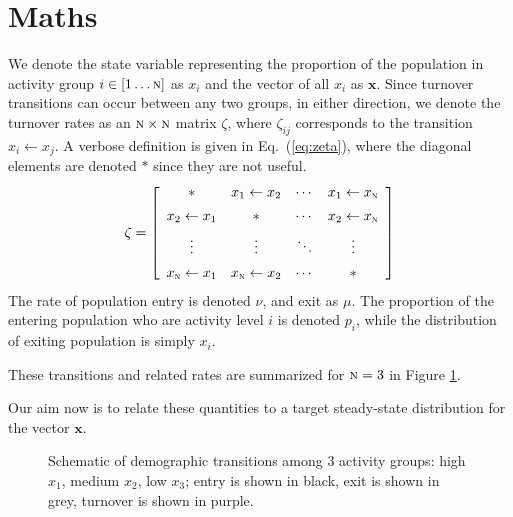 \documentclass{article}
\newcommand{\N}{\textsc{n}}
\begin{document}
\section{Maths}
We denote the state variable representing
the proportion of the population in activity group $i \in [1 \dots \N]$ as $x_i$
and the vector of all $x_i$ as $\bm{x}$.
Since turnover transitions can occur between any two groups, in either direction,
we denote the turnover rates as an $\N \times \N$ matrix $\zeta$,
where $\zeta_{ij}$ corresponds to the transition $x_i \leftarrow x_j$.
A verbose definition is given in Eq.~(\ref{eq:zeta}),
where the diagonal elements are denoted $*$ since they are not useful.
\begin{equation}\label{eq:zeta}
\zeta = \left[\begin{array}{cccc}
	         *          & x_1  \leftarrow x_2 & \cdots & x_1 \leftarrow x_\N \\[0.5em]
	x_2  \leftarrow x_1 &          *          & \cdots & x_2 \leftarrow x_\N \\[0.5em]
	      \vdots        &       \vdots        & \ddots &       \vdots        \\[0.5em]
	x_\N \leftarrow x_1 & x_\N \leftarrow x_2 & \cdots &          *
\end{array}\right]
\end{equation}
The rate of population entry is denoted $\nu$, and exit as $\mu$.
The proportion of the entering population who are activity level $i$ is denoted $p_i$,
while the distribution of exiting population is simply $x_i$.
\par
These transitions and related rates are summarized for $\N = 3$ in Figure \ref{fig:turnover}.
\par
Our aim now is to relate these quantities to
a target steady-state distribution for the vector $\bm{x}$.
\begin{figure}
  \centering
  
  \caption{Schematic of demographic transitions among 3 activity groups:
    high $x_1$, medium $x_2$, low $x_3$;
    entry is shown in black,
    exit is shown in grey,
    turnover is shown in purple.}%
  \label{fig:turnover}
\end{figure}
\end{document}
